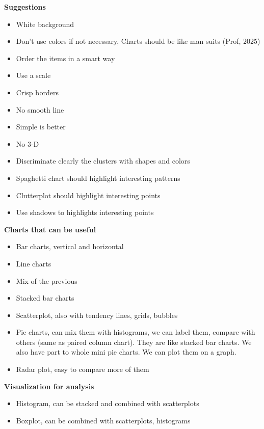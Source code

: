 \textbf{Suggestions}

\begin{itemize}
    \item White background
    \item Don't use colors if not necessary, Charts should be like man suits (Prof, 2025)
    \item Order the items in a smart way
    \item Use a scale
    \item Crisp borders
    \item No smooth line
    \item Simple is better
    \item No 3-D
    \item Discriminate clearly the clusters with shapes and colors
    \item Spaghetti chart should highlight interesting patterns
    \item Clutterplot should highlight interesting points
    \item Use shadows to highlights interesting points
\end{itemize}

\vspace{10pt}

\textbf{Charts that can be useful}

\begin{itemize}
    \item Bar charts, vertical and horizontal
    \item Line charts
    \item Mix of the previous
    \item Stacked bar charts
    \item Scatterplot, also with tendency lines, grids, bubbles
    \item Pie charts, can mix them with histograms, we can label them, compare with others (same as paired column chart). They are like stacked bar charts. We also have part to whole mini pie charts. We can plot them on a graph.
    \item  Radar plot, easy to compare more of them
\end{itemize}

\vspace{10pt}

\textbf{Visualization for analysis}


\begin{itemize}
    \item Histogram, can be stacked and combined with scatterplots
    \item Boxplot, can be combined with scatterplots, histograms
\end{itemize}

